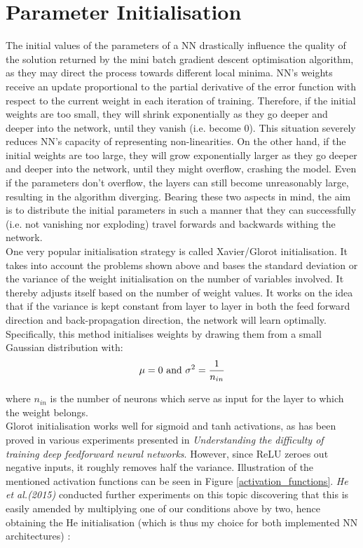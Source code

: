 
 \section{Parameter Initialisation}

The initial values of the parameters of a NN drastically influence the quality of the solution returned by the mini batch gradient descent optimisation algorithm, as they may direct the process towards different local minima. NN's weights receive an update proportional to the partial derivative of the error function with respect to the current weight in each iteration of training. Therefore, if the initial weights are too small, they will shrink exponentially as they go deeper and deeper into the network, until they vanish (i.e. become 0). This situation severely reduces NN's capacity of representing non-linearities. On the other hand, if the initial weights are too large, they will grow exponentially larger as they go deeper and deeper into the network, until they might overflow, crashing the model. Even if the parameters don't overflow, the layers can still become unreasonably large, resulting in the algorithm diverging. Bearing these two aspects in mind, the aim is to distribute the initial parameters in such a manner that they can successfully (i.e. not vanishing nor exploding) travel forwards and backwards withing the network. \\

One very popular initialisation strategy is called Xavier/Glorot initialisation. It takes into account the problems shown above and bases the standard deviation or the variance of the weight initialisation on the number of variables involved. It thereby adjusts itself based on the number of weight values. It works on the idea that if the variance is kept constant from layer to layer in both the feed forward direction and back-propagation direction, the network will learn optimally. Specifically, this method initialises weights by drawing them from a small Gaussian distribution with: \\

\begin{equation}
  \centering
  \mu = 0 \ \text{and} \ \sigma^2 = \frac{1}{n_{in}}
\end{equation}

where $n_{in}$ is the number of neurons which serve as input for the layer to which the weight belongs. \\

Glorot initialisation works well for sigmoid and tanh activations, as has been proved in various experiments presented in \textit{Understanding the difficulty of training deep feedforward neural networks}. However, since ReLU zeroes out negative inputs, it roughly removes half the variance. Illustration of the mentioned activation functions can be seen in Figure \ref{activation_functions}. \textit{He et al.(2015)} conducted further experiments on this topic discovering that this is easily amended by multiplying one of our conditions above by two, hence obtaining the He initialisation (which is thus my choice for both implemented NN architectures) :

